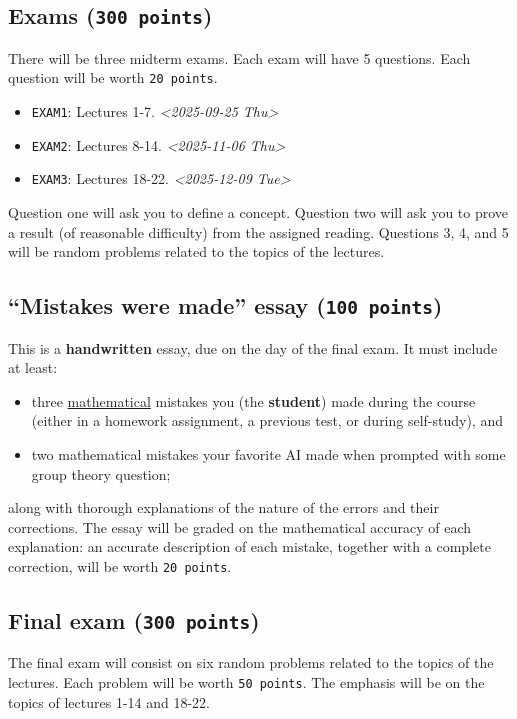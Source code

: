 \documentclass[11pt]{article}
\begin{document}
\subsection*{Exams (\texttt{300 points})}
\label{sec:org0a43378}
There will be three midterm exams. Each exam will have 5 questions. Each question will
be worth \texttt{20 points}.
\begin{itemize}
\item \texttt{EXAM1}: Lectures 1-7. \textit{<2025-09-25 Thu>}
\item \texttt{EXAM2}: Lectures 8-14. \textit{<2025-11-06 Thu>}
\item \texttt{EXAM3}: Lectures 18-22. \textit{<2025-12-09 Tue>}
\end{itemize}
Question one will ask you to define a concept. Question two will ask you to
prove a result (of reasonable difficulty) from the assigned reading. Questions
3, 4, and 5 will be random problems related to the topics of the lectures.
\subsection*{``Mistakes were made'' essay (\texttt{100 points})}
\label{sec:orgf63fba0}
This is a \textbf{handwritten} essay, due on the day of the final exam. It must
include at least:
\begin{itemize}
\item three \uline{mathematical} mistakes you (the \textbf{student}) made during the course
(either in a homework assignment, a previous test, or during self-study), and
\item two mathematical mistakes your favorite AI made when prompted with some group
theory question;
\end{itemize}

along with thorough explanations of the nature of the errors and their
corrections. The essay will be graded on the mathematical accuracy of each
explanation: an accurate description of each mistake, together with a complete
correction, will be worth \texttt{20 points}.

\subsection*{Final exam (\texttt{300 points})}
\label{sec:orgeb41d47}
The final exam will consist on six random problems related to the topics of the
lectures. Each problem will be worth \texttt{50 points}. The emphasis will be on the
topics of lectures 1-14 and 18-22. 
\end{document}

